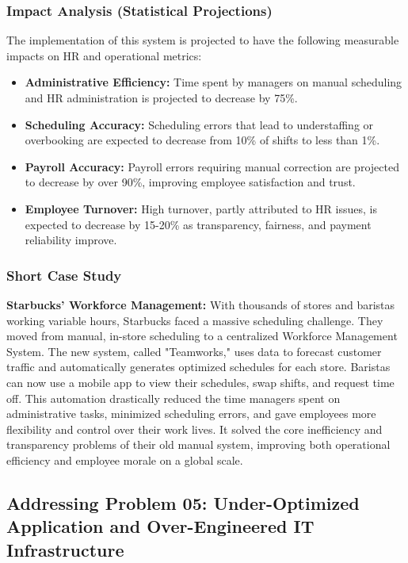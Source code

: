 \documentclass[12pt,a4paper]{article}
\begin{document}
\subsubsection{Impact Analysis (Statistical Projections)}
The implementation of this system is projected to have the following measurable impacts on HR and operational metrics:

\begin{itemize}
    \item \textbf{Administrative Efficiency:} Time spent by managers on manual scheduling and HR administration is projected to decrease by 75\%.
    \item \textbf{Scheduling Accuracy:} Scheduling errors that lead to understaffing or overbooking are expected to decrease from 10\% of shifts to less than 1\%.
    \item \textbf{Payroll Accuracy:} Payroll errors requiring manual correction are projected to decrease by over 90\%, improving employee satisfaction and trust.
    \item \textbf{Employee Turnover:} High turnover, partly attributed to HR issues, is expected to decrease by 15-20\% as transparency, fairness, and payment reliability improve.
\end{itemize}

\subsubsection{Short Case Study}

\textbf{Starbucks' Workforce Management:} With thousands of stores and baristas working variable hours, Starbucks faced a massive scheduling challenge. They moved from manual, in-store scheduling to a centralized Workforce Management System. The new system, called "Teamworks," uses data to forecast customer traffic and automatically generates optimized schedules for each store. Baristas can now use a mobile app to view their schedules, swap shifts, and request time off. This automation drastically reduced the time managers spent on administrative tasks, minimized scheduling errors, and gave employees more flexibility and control over their work lives. It solved the core inefficiency and transparency problems of their old manual system, improving both operational efficiency and employee morale on a global scale.

\subsection{Addressing Problem 05: Under-Optimized Application and Over-Engineered IT Infrastructure}
\end{document}
